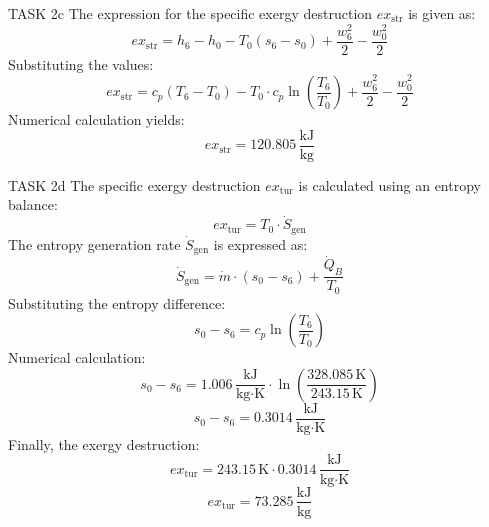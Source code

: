 TASK 2c  
The expression for the specific exergy destruction \( ex_{\text{str}} \) is given as:  
\[
ex_{\text{str}} = h_6 - h_0 - T_0 (s_6 - s_0) + \frac{w_6^2}{2} - \frac{w_0^2}{2}
\]  
Substituting the values:  
\[
ex_{\text{str}} = c_p (T_6 - T_0) - T_0 \cdot c_p \ln \left( \frac{T_6}{T_0} \right) + \frac{w_6^2}{2} - \frac{w_0^2}{2}
\]  
Numerical calculation yields:  
\[
ex_{\text{str}} = 120.805 \, \frac{\text{kJ}}{\text{kg}}
\]  

TASK 2d  
The specific exergy destruction \( ex_{\text{tur}} \) is calculated using an entropy balance:  
\[
ex_{\text{tur}} = T_0 \cdot \dot{S}_{\text{gen}}
\]  
The entropy generation rate \( \dot{S}_{\text{gen}} \) is expressed as:  
\[
\dot{S}_{\text{gen}} = \dot{m} \cdot (s_0 - s_6) + \frac{\dot{Q}_B}{T_0}
\]  
Substituting the entropy difference:  
\[
s_0 - s_6 = c_p \ln \left( \frac{T_6}{T_0} \right)
\]  
Numerical calculation:  
\[
s_0 - s_6 = 1.006 \, \frac{\text{kJ}}{\text{kg·K}} \cdot \ln \left( \frac{328.085 \, \text{K}}{243.15 \, \text{K}} \right)
\]  
\[
s_0 - s_6 = 0.3014 \, \frac{\text{kJ}}{\text{kg·K}}
\]  
Finally, the exergy destruction:  
\[
ex_{\text{tur}} = 243.15 \, \text{K} \cdot 0.3014 \, \frac{\text{kJ}}{\text{kg·K}}
\]  
\[
ex_{\text{tur}} = 73.285 \, \frac{\text{kJ}}{\text{kg}}
\]